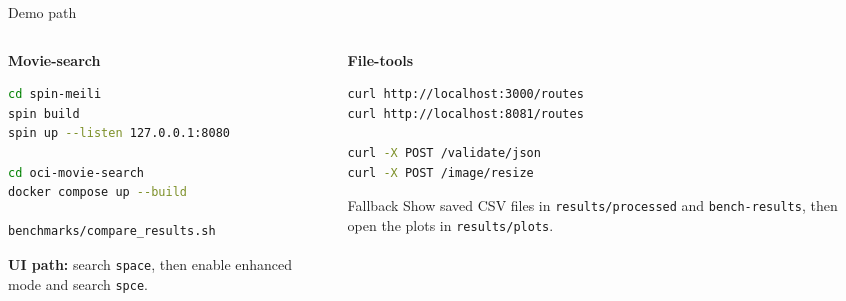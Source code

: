 \documentclass[aspectratio=169,10pt]{beamer}
\begin{document}
\begin{frame}[fragile]{Demo path}
  \begin{columns}[T,onlytextwidth]
    \begin{column}{0.53\linewidth}
      \textbf{Movie-search}
      \begin{lstlisting}[language=bash]
cd spin-meili
spin build
spin up --listen 127.0.0.1:8080

cd oci-movie-search
docker compose up --build

benchmarks/compare_results.sh
      \end{lstlisting}
      \textbf{UI path:} search \texttt{space}, then enable enhanced mode and search \texttt{spce}.
    \end{column}
    \begin{column}{0.43\linewidth}
      \textbf{File-tools}
      \begin{lstlisting}[language=bash]
curl http://localhost:3000/routes
curl http://localhost:8081/routes

curl -X POST /validate/json
curl -X POST /image/resize
      \end{lstlisting}

      \begin{block}{Fallback}
        Show saved CSV files in \texttt{results/processed} and \texttt{bench-results}, then open the plots in \texttt{results/plots}.
      \end{block}
    \end{column}
  \end{columns}
\end{frame}
\end{document}
